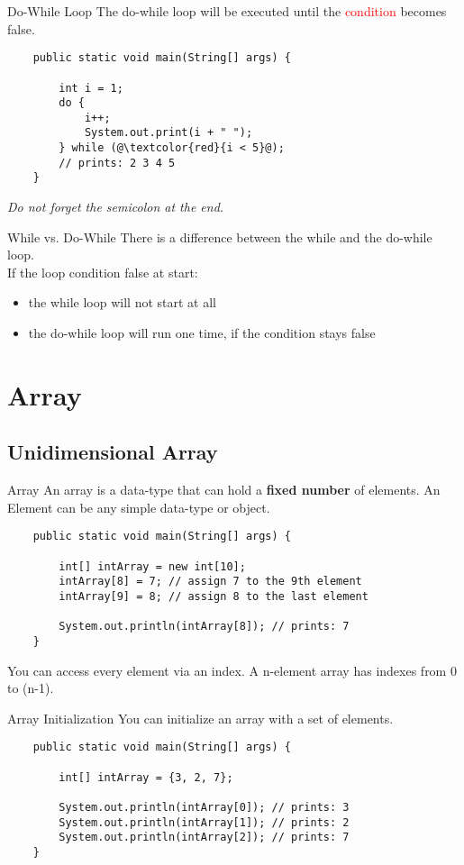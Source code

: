 \begin{frame}[fragile]{Do-While Loop}
	The do-while loop will be executed until the \textcolor{red}{condition} becomes false.
	\begin{lstlisting}
	public static void main(String[] args) {
	
	    int i = 1;
	    do {
	        i++;
	        System.out.print(i + " ");
	    } while (@\textcolor{red}{i < 5}@);
	    // prints: 2 3 4 5
	}
	\end{lstlisting}
	\emph{Do not forget the semicolon at the end.}
\end{frame}

\begin{frame}{While vs. Do-While}
	There is a difference between the while and the do-while loop. \\
	\vfill
	If the loop condition false at start:
	\begin{itemize}
		\item the while loop will not start at all
		\item the do-while loop will run one time, if the condition stays false
	\end{itemize}
\end{frame}

\section{Array}
\subsection{Unidimensional Array}
\begin{frame}[fragile]{Array}
	An array is a data-type that can hold a \textbf{fixed number} of elements. 
	An Element can be any simple data-type or object.
	\begin{lstlisting}
	public static void main(String[] args) {
	
	    int[] intArray = new int[10];
	    intArray[8] = 7; // assign 7 to the 9th element
	    intArray[9] = 8; // assign 8 to the last element
	    
	    System.out.println(intArray[8]); // prints: 7
	}
	\end{lstlisting}
	You can access every element via an index. A n-element array has indexes from 0 to (n-1).
\end{frame}

\begin{frame}[fragile]{Array Initialization} %
	You can initialize an array with a set of elements.
	\begin{lstlisting}
	public static void main(String[] args) {
	
	    int[] intArray = {3, 2, 7};
	    
	    System.out.println(intArray[0]); // prints: 3
	    System.out.println(intArray[1]); // prints: 2
	    System.out.println(intArray[2]); // prints: 7
	}
	\end{lstlisting}
\end{frame}

